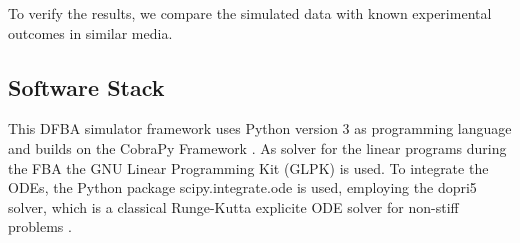 
To verify the results, we compare the simulated data with known experimental outcomes in similar media.

\subsection{Software Stack}
	This DFBA simulator framework uses Python version 3 as programming language and builds on the CobraPy Framework \cite{ebrahim_cobrapy_2013}.
	As solver for the linear programs during the FBA the GNU Linear Programming Kit (GLPK) is used.
	To integrate the ODEs, the Python package scipy.integrate.ode is used, employing the dopri5 solver, which is a classical Runge-Kutta explicite ODE solver for non-stiff problems \cite{hairer1993solving}.
